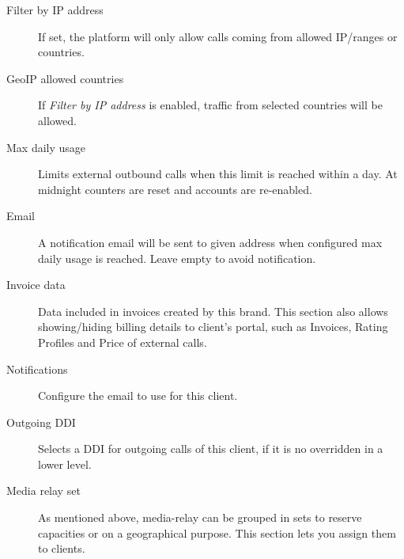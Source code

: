 \documentclass[letterpaper,10pt,spanish]{sphinxmanual}
\begin{document}
\begin{description}
\item[{Filter by IP address}] \leavevmode{}\label{administration_portal/brand/clients/virtual_pbx:term-filter-by-ip-address}
If set, the platform will only allow calls coming from allowed IP/ranges or countries.

\item[{GeoIP allowed countries}] \leavevmode{}\label{administration_portal/brand/clients/virtual_pbx:term-geoip-allowed-countries}
If \emph{Filter by IP address} is enabled, traffic from selected countries will be allowed.

\item[{Max daily usage}] \leavevmode{}\label{administration_portal/brand/clients/virtual_pbx:term-max-daily-usage}
Limits external outbound calls when this limit is reached within a day. At midnight counters are reset and
accounts are re-enabled.

\item[{Email}] \leavevmode{}\label{administration_portal/brand/clients/virtual_pbx:term-email}
A notification email will be sent to given address when configured max daily usage is reached. Leave empty to
avoid notification.

\item[{Invoice data}] \leavevmode{}\label{administration_portal/brand/clients/virtual_pbx:term-invoice-data}
Data included in invoices created by this brand. This section also allows showing/hiding billing details to
client's portal, such as Invoices, Rating Profiles and Price of external calls.

\item[{Notifications}] \leavevmode{}\label{administration_portal/brand/clients/virtual_pbx:term-notifications}
Configure the email {\hyperref[administration_portal/brand/settings/notification_templates:notification\string-templates]{}} to use for this client.

\item[{Outgoing DDI}] \leavevmode{}\label{administration_portal/brand/clients/virtual_pbx:term-outgoing-ddi}
Selects a DDI for outgoing calls of this client, if it is no overridden in
a lower level.

\item[{Media relay set}] \leavevmode{}\label{administration_portal/brand/clients/virtual_pbx:term-media-relay-set}
As mentioned above, media-relay can be grouped in sets to reserve capacities
or on a geographical purpose. This section lets you assign them to clients.


\end{description}
\end{document}
